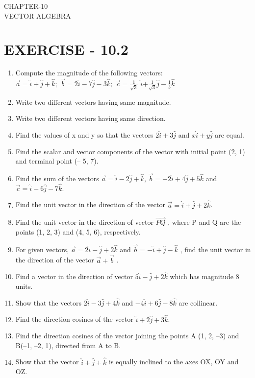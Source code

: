 \documentclass[12pt]{article}
\begin{document}
\begin{center}
\textbf\large{CHAPTER-10 \\ VECTOR ALGEBRA}
\end{center}
\section{EXERCISE - 10.2}
\begin{enumerate}
\item Compute the magnitude of the following vectors:\\
	$\vec{a}=\hat{i}+\hat{j}+\hat{k};$    $\vec{b}=2\hat{i}-7\hat{j}-3\hat{k};$  $\vec{c}=\frac{1}{\sqrt{3}}$ $\hat {i}$+$\frac{1}{\sqrt{3}}\hat{j}-\frac{1}{3}\hat{k}$
\item Write two different vectors having same magnitude.
\item Write two different vectors having same direction.
\item Find the values of x and y so that the vectors $2\hat{i}+3\hat{j}$ and $x\hat{i}+y\hat{j}$ are equal.
\item Find the scalar and vector components of the vector with initial point (2, 1) and
terminal point (– 5, 7).
\item Find the sum of the vectors $\vec{a}=\hat{i}-2\hat{j}+\hat{k}$, $\vec{b}=-2\hat{i}+4\hat{j}+5\hat{k}$ and $\vec{c}=\hat{i}-6\hat{j}-7\hat{k}$.
\item Find the unit vector in the direction of the vector $\vec{a}=\hat{i}+\hat{j}+2\hat{k}$.
\item Find the unit vector in the direction of vector $\overrightarrow{PQ}$ , where P and Q are the points
(1, 2, 3) and (4, 5, 6), respectively.
\item For given vectors, $\vec{a}=2\hat{i}-\hat{j}+2\hat{k}$ and $\vec{b}=-\hat{i}+\hat{j}-\hat{k}$ , find the unit vector in the
direction of the vector $\vec{a}+\vec{b}$
.
\item Find a vector in the direction of vector $5\hat{i}-\hat{j}+2\hat{k}$ which has magnitude 8 units.
\item Show that the vectors $2\hat{i}-3\hat{j}+4\hat{k}$ and $-4\hat{i}+6\hat{j}-8\hat{k}$ are collinear.
\item Find the direction cosines of the vector $\hat{i}+2\hat{j}+3\hat{k}$.
\item Find the direction cosines of the vector joining the points A (1, 2, –3) and
B(–1, –2, 1), directed from A to B.
\item Show that the vector $\hat{i}+\hat{j}+\hat{k}$ is equally inclined to the axes OX, OY and OZ.

\end{enumerate}
\end{document}

